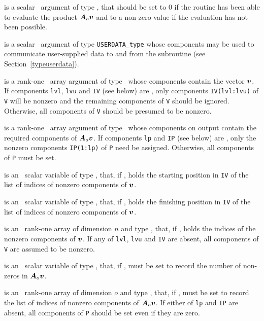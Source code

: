 \documentclass{galahad}
\begin{document}
\begin{description}
 is a scalar \intentout\ argument of type \integer,
that should be set to 0 if the routine has been able to evaluate the
product ${\bm{A}}_o {\bm{v}}$
and to a non-zero value if the evaluation has not been possible.

 is a scalar \intentinout\ argument of type
{\tt USERDATA\_type} whose components may be used
to communicate user-supplied data to and from the
subroutine (see Section~\ref{typeuserdata}).

 is a rank-one \intentin\ array argument of type \realdp\
whose components contain the vector ${\bm{v}}$.
If components
{\tt lvl},
{\tt lvu}
and
{\tt IV}
(see below) are \present,
only components {\tt IV(lvl:lvu)} of {\tt V}
will be nonzero and the remaining components of {\tt V} should be
ignored. Otherwise, all components of {\tt V} should be presumed to be nonzero.

 is a rank-one \intentout\ array argument of type \realdp\
whose components on output contain the required components of ${\bm{A}}_o {\bm{v}}$.
If components
{\tt lp}
and
{\tt IP}
(see below) are \present,
only the nonzero components {\tt IP(1:lp)} of {\tt P}
need be assigned.
Otherwise, all components of {\tt P} must be set.

 is an \optional\ scalar variable of type \integer,
that, if \present, holds the starting position in {\tt IV}
of the list of indices of nonzero components of ${\bm{v}}$.

 is an \optional\ scalar variable of type \integer,
that, if \present, holds the finishing position in {\tt IV}
of the list of indices of nonzero components of ${\bm{v}}$.

 is an \optional\  rank-one array of dimension $n$
and type \integer, that, if \present, holds the indices of the
nonzero components of ${\bm{v}}$. If any of
{\tt lvl},
{\tt lvu}
and
{\tt IV}
are absent, all components of {\tt V} are assumed to be nonzero.

\itt{lp} is an \optional\ scalar variable of type \integer,
that, if \present, must be set to record the number of non-zeros in
${\bm{A}}_o {\bm{v}}$.

 is an \optional\ rank-one array of dimension $o$
and type \integer, that, if \present, must be set to record the list
of indices of nonzero components of ${\bm{A}}_o {\bm{v}}$.
If either of
{\tt lp}
and
{\tt IP}
are absent, all components of {\tt P} should be set even if they are zero.

\end{description}
\end{document}
